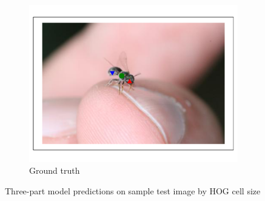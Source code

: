\documentclass[11pt, oneside]{report}
\begin{document}
\begin{figure}[p]
\begin{subfigure}[b]{0.3\textwidth}
                \includegraphics[width=\textwidth]{hog_gt2.pdf}
                \caption{Ground truth}
            \end{subfigure}

            \hspace{0pt}

            \begin{subfigure}[b]{0.2\textwidth}
                \centering
            \end{subfigure}
            \caption{Three-part model predictions on sample test image by HOG cell size}
            \label{fig:hog_vis2}
        \end{figure}
\end{document}
